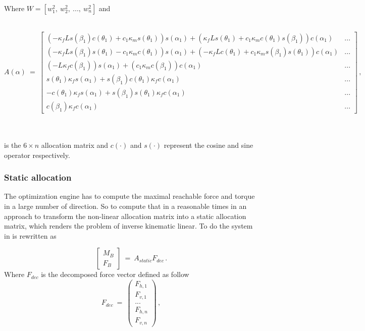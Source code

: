 Where $W = [w_1^2,\ w_2^2,\ ...,\ w_n^2]$ and\\\\
\centerline{\begingroup
    \fontsize{9pt}{11pt}\selectfont
$A(\alpha) \ = \
\begin{bmatrix}
  (-\kappa_f L s(\beta_1) c(\theta_1) +c_1\kappa_m s(\theta_1)) s(\alpha_1)
  + (\kappa_f L s(\theta_1) +c_1 \kappa_m c(\theta_1) s(\beta_1)) c(\alpha_1) & ...\\
  (-\kappa_f L s(\beta_1) s(\theta_1) - c_1 \kappa_m c(\theta_1)) s(\alpha_1)
  + (-\kappa_f L c(\theta_1) +c_1 \kappa_m s(\beta_1) s(\theta_1)) c(\alpha_1) & ...\\
  (-L \kappa_f c(\beta_1)) s(\alpha_1) +(c_1 \kappa_m c(\beta_1)) c(\alpha_1) & ...\\
  s(\theta_1) \kappa_f s(\alpha_1) + s(\beta_1) c(\theta_1) \kappa_f c(\alpha_1) & ...\\
  -c(\theta_1) \kappa_f s(\alpha_1) +s(\beta_1) s(\theta_1) \kappa_f c(\alpha_1) & ...\\
  c(\beta_1) \kappa_f c(\alpha_1) & ...
\end{bmatrix} \, ,$
\endgroup}\\\\
is the $6 \times n$ allocation matrix and $c(\cdot)$ and $s(\cdot)$ represent the
cosine and sine operator respectively.

\subsubsection{Static allocation}
\label{sec:allocation}
The optimization engine has to compute the maximal reachable force and torque in
a large number of direction. So to compute that in a reasonable times in
\citep{kamel_voliro:_2018} an approach to transform the non-linear allocation matrix
into a static allocation matrix, which renders the problem of inverse kinematic
linear. To do the system in \Cref{force_eq} is rewritten as

\begin{equation}
  \label{static_force_eq}
    \begin{bmatrix}
      M_B \\
      F_B
    \end{bmatrix} \ = \
    A_{static}F_{dec}
    \, .
\end{equation}
Where $F_{dec}$ is the decomposed force vector defined as follow
\begin{equation}
  \label{f_dec}
    F_{dec} \ = \
    \begin{pmatrix}
      F_{h,1} \\
      F_{v,1} \\
      ... \\
      F_{h,n} \\
      F_{v,n}
    \end{pmatrix} \, ,
\end{equation}


